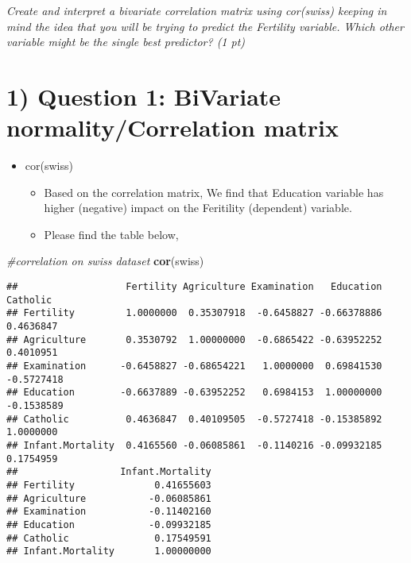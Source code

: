 \documentclass[]{article}
\newenvironment{Shaded}{\begin{snugshade}}{\end{snugshade}}
\newcommand{\CommentTok}[1]{\textcolor[rgb]{0.56,0.35,0.01}{\textit{#1}}}
\newcommand{\KeywordTok}[1]{\textcolor[rgb]{0.13,0.29,0.53}{\textbf{#1}}}
\newcommand{\NormalTok}[1]{#1}
\providecommand{\tightlist}{%
  \setlength{\itemsep}{0pt}\setlength{\parskip}{0pt}}
\begin{document}
\emph{Create and interpret a bivariate correlation matrix using
cor(swiss) keeping in mind the idea that you will be trying to predict
the Fertility variable. Which other variable might be the single best
predictor? (1 pt)}

\hypertarget{question-1-bivariate-normalitycorrelation-matrix}{%
\section{1) Question 1: BiVariate normality/Correlation
matrix}\label{question-1-bivariate-normalitycorrelation-matrix}}

\begin{itemize}
\tightlist
\item
  cor(swiss)

  \begin{itemize}
  \tightlist
  \item
    Based on the correlation matrix, We find that Education variable has
    higher (negative) impact on the Feritility (dependent) variable.
  \item
    Please find the table below,
  \end{itemize}
\end{itemize}

\begin{Shaded}
\begin{Highlighting}[]
\CommentTok{#correlation on swiss dataset}
\KeywordTok{cor}\NormalTok{(swiss)}
\end{Highlighting}
\end{Shaded}

\begin{verbatim}
##                   Fertility Agriculture Examination   Education   Catholic
## Fertility         1.0000000  0.35307918  -0.6458827 -0.66378886  0.4636847
## Agriculture       0.3530792  1.00000000  -0.6865422 -0.63952252  0.4010951
## Examination      -0.6458827 -0.68654221   1.0000000  0.69841530 -0.5727418
## Education        -0.6637889 -0.63952252   0.6984153  1.00000000 -0.1538589
## Catholic          0.4636847  0.40109505  -0.5727418 -0.15385892  1.0000000
## Infant.Mortality  0.4165560 -0.06085861  -0.1140216 -0.09932185  0.1754959
##                  Infant.Mortality
## Fertility              0.41655603
## Agriculture           -0.06085861
## Examination           -0.11402160
## Education             -0.09932185
## Catholic               0.17549591
## Infant.Mortality       1.00000000
\end{verbatim}
\end{document}
